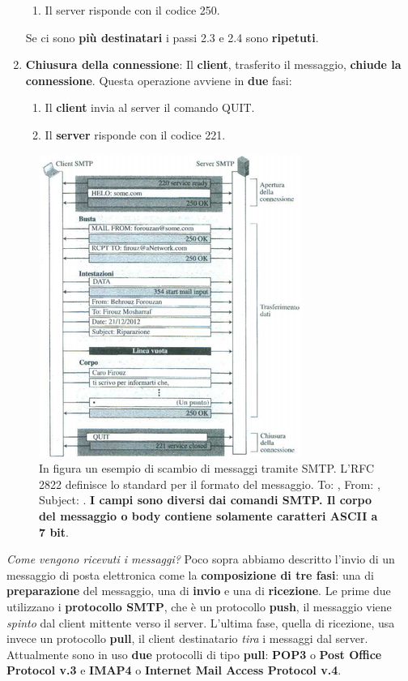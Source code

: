 \documentclass[11pt,a4paper]{article}
\theoremstyle{definition}
\begin{document}
\begin{enumerate}
\begin{enumerate}[label*=\arabic*.]
		      \item Il server risponde con il codice 250.
	      \end{enumerate}
	      Se ci sono \textbf{più destinatari} i passi 2.3 e 2.4 sono \textbf{ripetuti}.
	\item \textbf{Chiusura della connessione}: Il \textbf{client}, trasferito il messaggio, \textbf{chiude la connessione}. Questa operazione avviene in \textbf{due} fasi:
	      \begin{enumerate}[label*=\arabic*]
		      \item Il \textbf{client} invia al server il comando QUIT.
		      \item Il \textbf{server} risponde con il codice 221.
	      \end{enumerate}
\end{enumerate}
\newpage
\begin{figure}[!h]
	\includegraphics[scale=0.8]{Immagini/SMTPes.png}
	\centering
	\caption{In figura un esempio di scambio di messaggi tramite SMTP. L'RFC 2822 definisce lo standard per il formato del messaggio. To: , From: , Subject: . \textbf{I campi sono diversi dai comandi SMTP. Il corpo del messaggio o body contiene solamente caratteri ASCII a 7 bit}.}
\end{figure}
\textit{Come vengono ricevuti i messaggi?}\newline\newline
Poco sopra abbiamo descritto l'invio di un messaggio di posta elettronica come la \textbf{composizione di tre fasi}: una di \textbf{preparazione} del messaggio, una di \textbf{invio} e una di \textbf{ricezione}. Le prime due utilizzano i \textbf{protocollo SMTP}, che è un protocollo \textbf{push}, il messaggio viene \textit{spinto} dal client mittente verso il server. L'ultima fase, quella di ricezione, usa invece un protocollo \textbf{pull}, il client destinatario \textit{tira} i messaggi dal server. Attualmente sono in uso \textbf{due} protocolli di tipo \textbf{pull}: \textbf{POP3} o \textbf{Post Office Protocol v.3} e \textbf{IMAP4} o \textbf{Internet Mail Access Protocol v.4}.
\end{document}
